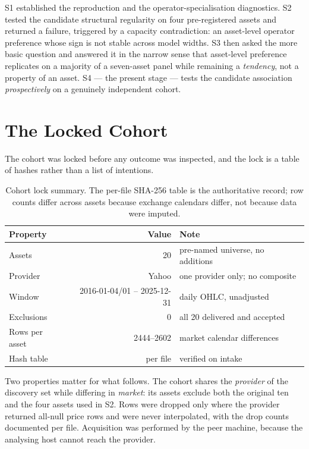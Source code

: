 \documentclass[conference]{IEEEtran}
\begin{document}
S1 established the reproduction and the operator-specialisation diagnostics. S2 tested the candidate
structural regularity on four pre-registered assets and returned a failure, triggered by a capacity
contradiction: an asset-level operator preference whose sign is not stable across model widths. S3
then asked the more basic question and answered it in the narrow sense that asset-level preference
replicates on a majority of a seven-asset panel while remaining a \emph{tendency}, not a property of
an asset. S4 --- the present stage --- tests the candidate association \emph{prospectively} on a
genuinely independent cohort.

\section{The Locked Cohort}
\label{sec:cohort}

The cohort was locked before any outcome was inspected, and the lock is a table of hashes rather than
a list of intentions.

\begin{table}[!t]
\centering
\footnotesize
\begin{tabular}{@{}lrl@{}}
\toprule
Property & Value & Note \\
\midrule
Assets & 20 & pre-named universe, no additions \\
Provider & Yahoo & one provider only; no composite \\
Window & 2016-01-04/01 -- 2025-12-31 & daily OHLC, unadjusted \\
Exclusions & 0 & all 20 delivered and accepted \\
Rows per asset & 2444--2602 & market calendar differences \\
Hash table & per file & verified on intake \\
\bottomrule
\end{tabular}
\caption{Cohort lock summary. The per-file SHA-256 table is the authoritative record; row counts
differ across assets because exchange calendars differ, not because data were imputed.}
\label{tab:cohort}
\end{table}

Two properties matter for what follows. The cohort shares the \emph{provider} of the discovery set
while differing in \emph{market}: its assets exclude both the original ten and the four assets used in
S2. Rows were dropped only where the provider returned all-null price rows and were never
interpolated, with the drop counts documented per file. Acquisition was performed by the peer machine,
because the analysing host cannot reach the provider.
\end{document}
